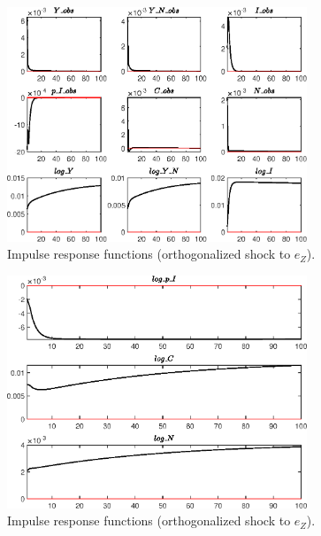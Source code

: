 \begin{figure}[H]
\centering 
\includegraphics[width=0.80\textwidth]{BRS_growth_res/graphs/BRS_growth_res_IRF_e_Z1}
\caption{Impulse response functions (orthogonalized shock to ${e_Z}$).}\label{Fig:IRF:e_Z:1}
\end{figure}
 
\begin{figure}[H]
\centering 
\includegraphics[width=0.80\textwidth]{BRS_growth_res/graphs/BRS_growth_res_IRF_e_Z2}
\caption{Impulse response functions (orthogonalized shock to ${e_Z}$).}\label{Fig:IRF:e_Z:2}
\end{figure}
 
